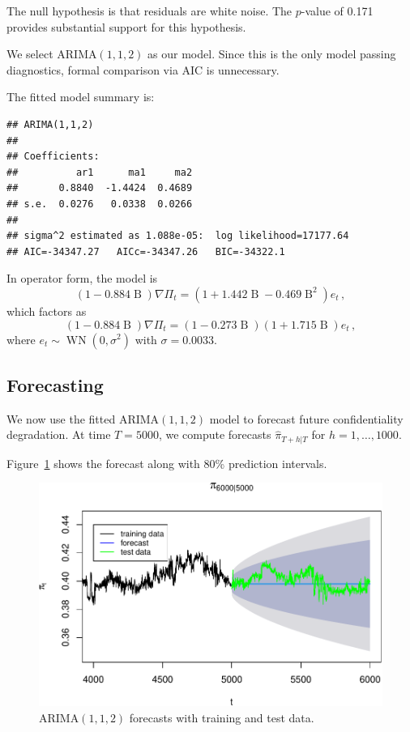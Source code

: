 \documentclass[final,11pt]{article}
\newcommand{\backshift}{\operatorname{B}}
\theoremstyle{plain}
\theoremstyle{remark}
\begin{document}
The null hypothesis is that residuals are white noise. The $p$-value of
0.171 provides substantial support for this hypothesis.

We select ARIMA$(1,1,2)$ as our model. Since this is the only model
passing diagnostics, formal comparison via AIC is unnecessary.

The fitted model summary is:

\begin{verbatim}
## ARIMA(1,1,2)
##
## Coefficients:
##          ar1      ma1     ma2
##       0.8840  -1.4424  0.4689
## s.e.  0.0276   0.0338  0.0266
##
## sigma^2 estimated as 1.088e-05:  log likelihood=17177.64
## AIC=-34347.27   AICc=-34347.26   BIC=-34322.1
\end{verbatim}

In operator form, the model is
\begin{equation}
  (1 - 0.884 \backshift) \nabla \Pi_t = (1 + 1.442 \backshift - 0.469 \backshift^2) e_t\,,
\end{equation}
which factors as
\begin{equation}
  (1 - 0.884 \backshift) \nabla \Pi_t = (1 - 0.273 \backshift) (1 + 1.715 \backshift) e_t\,,
\end{equation}
where $e_t \sim \operatorname{WN}(0, \sigma^2)$ with $\sigma = 0.0033$.

\hypertarget{forecasting}{%
\subsection{Forecasting}\label{forecasting}}

We now use the fitted ARIMA$(1,1,2)$ model to forecast future
confidentiality degradation. At time $T=5000$, we compute forecasts
$\hat{\pi}_{T+h|T}$ for $h = 1, \ldots, 1000$.

Figure~\ref{fig:forecast} shows the forecast along with 80\% prediction
intervals.

\begin{figure}
\includegraphics{paper_files/figure-latex/unnamed-chunk-16-1.pdf}
\caption{ARIMA$(1,1,2)$ forecasts with training and test data.}
\label{fig:forecast}
\end{figure}
\end{document}
